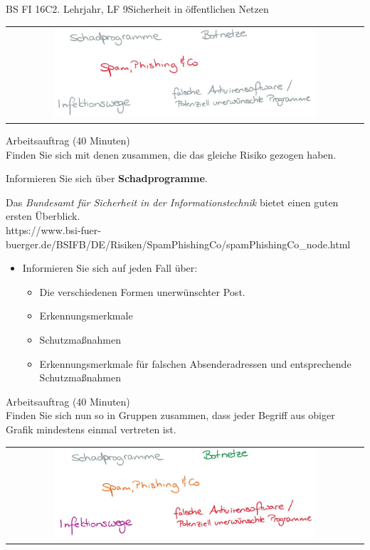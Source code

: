 \documentclass[oneside,openany,headings=optiontotoc,11pt,numbers=noenddot]{scrreprt}
\begin{document}
\begin{worksheet}{BS FI 16C}{2. Lehrjahr, LF 9}{Sicherheit in öffentlichen Netzen}
		\newpage
		\setcounter{page}{1}
		\begin{framed}
			\begin{tabular}{lcr}
				& \includegraphics[width=0.8\textwidth]{Bilder/SpamPhishing.jpg} & \\
			\end{tabular}
		\end{framed}
		\color{codegray}Arbeitsauftrag (40 Minuten)\\
		\color{black}
		Finden Sie sich mit denen zusammen, die das gleiche Risiko gezogen haben.
		\par
		\bigskip
		\noindent
		Informieren Sie sich über \textbf{Schadprogramme}.
		\par\bigskip\noindent
		Das \textit{Bundesamt für Sicherheit in der Informationstechnik} bietet einen guten ersten Überblick.\\
		\small{\color{codegray}https://www.bsi-fuer-buerger.de/BSIFB/DE/Risiken/SpamPhishingCo/spamPhishingCo\_node.html}
		\normalsize
		\begin{itemize}
			\item[] Informieren Sie sich auf jeden Fall über:
			\begin{itemize}
				\item Die verschiedenen Formen unerwünschter Post.
				\item Erkennungsmerkmale
				\item Schutzmaßnahmen
				\item Erkennungsmerkmale für falschen Absenderadressen und entsprechende Schutzmaßnahmen
			\end{itemize}
		\end{itemize}
		\par
		\bigskip
		\noindent
		
		\color{codegray}Arbeitsauftrag (40 Minuten)\\
		\color{black}
		Finden Sie sich nun so in Gruppen zusammen, dass jeder Begriff aus obiger Grafik mindestens einmal vertreten ist.

		\newpage
		\setcounter{page}{1}
		\noindent
		\begin{framed}
			\begin{tabular}{lcr}
				& \includegraphics[width=0.8\textwidth]{Bilder/Gefahren.jpg} &
			\end{tabular}
		\end{framed}
		

\end{worksheet}
\end{document}
